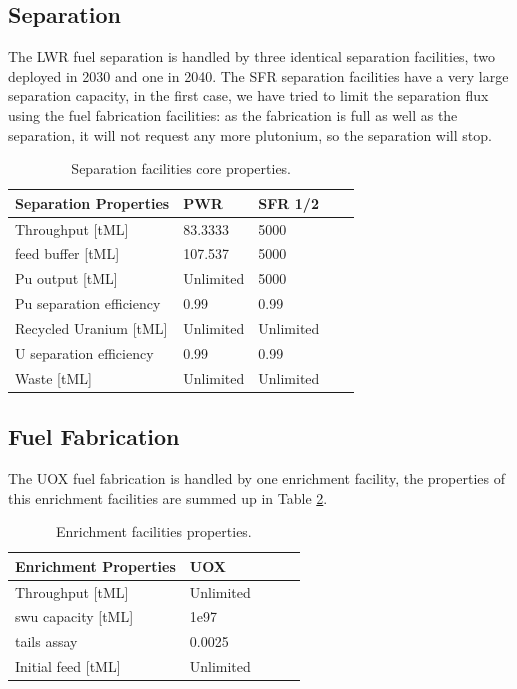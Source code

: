 \documentclass[12pt]{article}
\begin{document}
\subsection{Separation}

The LWR fuel separation is handled by three identical separation facilities,
two deployed in 2030 and one in 2040. The SFR separation facilities have a
very large separation capacity, in the first case, we have tried to limit the
separation flux using the fuel fabrication facilities: as the fabrication is
full as well as the separation, it will not request any more plutonium, so the
separation will stop.

\begin{table}[h!]
    \centering
    \begin{tabular}{lllll}
    \hline
    Separation Properties	&	PWR		&	SFR 1/2	\\
    \hline
    Throughput [tML]		&	83.3333	&	5000		\\
    feed buffer [tML]		&	107.537	&	5000		\\
    Pu output  [tML]		&	Unlimited	&	5000		\\
    Pu separation efficiency	&	0.99		&	0.99		\\
    Recycled Uranium [tML]	&	Unlimited	&	Unlimited	\\
    U separation efficiency	&	0.99		&	0.99		\\
    Waste [tML]			&	Unlimited	&	Unlimited	\\
    \hline
    \end{tabular}
    \caption{Separation facilities core properties. }
    \label{tab:separation_1}
\end{table}

\subsection{Fuel Fabrication}

The UOX fuel fabrication is handled by one enrichment facility, the properties
of this enrichment facilities are summed up in Table \ref{tab:enrich_1}.

\begin{table}[h!]
    \centering
    \begin{tabular}{lllll}
    \hline
    Enrichment Properties	&	UOX		\\
    \hline
    Throughput [tML]		&	Unlimited	\\
    swu capacity [tML]		&	1e97		\\
    tails assay  			&	0.0025	\\
    Initial feed [tML]		&	Unlimited	\\
    \hline
    \end{tabular}
    \caption{Enrichment facilities properties. }
    \label{tab:enrich_1}
\end{table}
\end{document}
